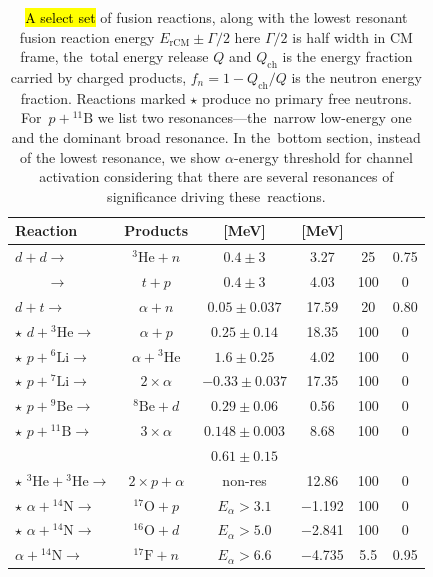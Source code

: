 \documentclass[particles,article,accept,pdftex,moreauthors]{Definitions/mdpi}
\begin{document}
\begin{table}[H]
\centering
\caption{\hl{A select set} %
 of fusion reactions, along with the lowest resonant fusion reaction energy $E_\mathrm{rCM}\pm\Gamma/2$ here $\Gamma/2$ is half width in CM frame, the~total energy release $Q$ and $Q_\mathrm{ch}$ is the energy fraction carried by charged products, $f_n = 1 - Q_\mathrm{ch}/Q$ is the neutron energy fraction. Reactions marked $\star$ produce no primary free neutrons. For~$p+{}^{11}\mathrm{B}$ we list two resonances---the~narrow low-energy one and the dominant broad resonance. In the~bottom section, instead of the lowest resonance, we show $\alpha$-energy threshold for channel activation considering that there are several resonances of significance driving these~reactions.}
\label{tab:aneutronic_reactions}
\begin{tabularx}{\textwidth}{lCcCCc}
\toprule
\textbf{Reaction} & \textbf{Products} &  \textbf{[MeV]} &  \textbf{[MeV]} &  &  \\
\midrule
\phantom{ $\star$ }$ d + d \to $ & ${}^{3}\mathrm{He}+n$ &$0.4\pm3$ &3.27 & 25 & 0.75 \\
\phantom{ $\star$ }$\phantom{d + d} \to $ & $t+p$ & $0.4\pm3$ &4.03 & 100 & 0 \\
\phantom{ $\star$ }$ d + t \to $ & $\alpha+n$ & $0.05\pm0.037$ &17.59 & 20 & 0.80 \\
\midrule
 $\star$ $d + {}^{3}\mathrm{He} \to $ & $\alpha+p$ & $0.25\pm0.14$ &18.35 & 100 & 0 \\
 $\star$ $p + {}^{6}\mathrm{Li} \to $ & $\alpha+ {}^{3}\mathrm{He}$ & $1.6\pm 0.25$ &4.02 & 100 & 0 \\
 $\star$ $p + {}^{7}\mathrm{Li} \to $ & $2\times\alpha$ &$ -0.33\pm0.037$ &17.35 & 100 & 0 \\
 $\star$ $p + {}^9\mathrm{Be} \to $ & ${}^{8}\mathrm{Be}+d$ & $0.29\pm 0.06$ & 0.56 & 100 & 0 \\
 $\star$ $p + {}^{11}\mathrm{B} \to $ & $3\times\alpha$ & $0.148\pm 0.003$ &8.68 & 100 & 0 \\
 \phantom{ $\star$ }$\phantom{p + {}^{11}\mathrm{B} \to}$ & \phantom{$3\times\alpha$} & $0.61\pm 0.15$ & & & \\
 $\star$ $ {}^{3}\mathrm{He} + {}^{3}\mathrm{He} \to $ & $2\times p+\alpha$ & non-res &12.86 & 100 & 0 \\
\midrule
 $\star$ $\alpha + {}^{14}\mathrm{N} \to $ & ${}^{17}\mathrm{O}+p$ & $E_\alpha>3.1$ & $-$1.192 & 100 & 0 \\
 $\star$ $\alpha + {}^{14}\mathrm{N} \to $ & ${}^{16}\mathrm{O}+d$ & $E_\alpha>5.0$ & $-$2.841 & 100 & 0 \\
 \phantom{$\star$} $\alpha + {}^{14}\mathrm{N} \to $ & ${}^{17}\mathrm{F}+n$ & $E_\alpha>6.6$ & $-$4.735 & 5.5 & 0.95 \\
\bottomrule
\end{tabularx}
\end{table}
\end{document}
